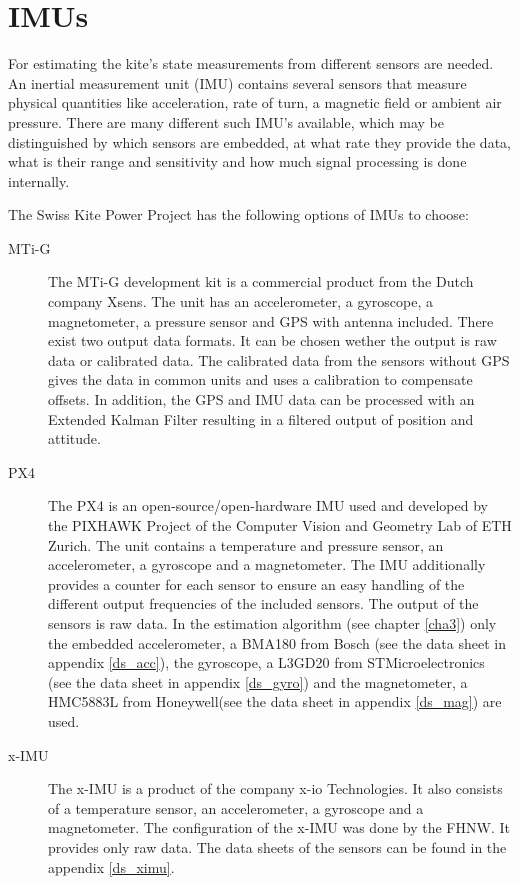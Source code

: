 \chapter{IMUs}\label{cha2}

For estimating the kite's state measurements from different sensors are needed. An inertial measurement unit (IMU) contains several sensors that measure physical quantities like acceleration, rate of turn, a magnetic field or ambient air pressure. There are many different such IMU's available, which may be distinguished by which sensors are embedded, at what rate they provide the data, what is their range and sensitivity and how much signal processing is done internally.

The Swiss Kite Power Project has the following options of IMUs to choose:

\begin{description}
\item[MTi-G]
The MTi-G development kit is a commercial product from the Dutch company Xsens. The unit has an accelerometer, a gyroscope, a magnetometer, a pressure sensor and GPS with antenna included. There exist two output data formats. It can be chosen wether the output is raw data or calibrated data. The calibrated data from the sensors without GPS gives the data in common units and uses a calibration to compensate offsets. In addition, the GPS and IMU data can be processed with an Extended Kalman Filter resulting in a filtered output of position and attitude.

\item[PX4]
The PX4 is an open-source/open-hardware IMU used and developed by the PIXHAWK Project of the Computer Vision and Geometry Lab of ETH Zurich. The unit contains a temperature and pressure sensor, an accelerometer, a gyroscope and a magnetometer. The IMU additionally provides a counter for each sensor to ensure an easy handling of the different output frequencies of the included sensors. The output of the sensors is raw data. In the estimation algorithm (see chapter \ref{cha3}) only the embedded accelerometer, a BMA180 from Bosch (see the data sheet in appendix \ref{ds_acc}), the gyroscope, a L3GD20 from STMicroelectronics (see the data sheet in appendix \ref {ds_gyro}) and the magnetometer, a HMC5883L from Honeywell(see the data sheet in appendix \ref{ds_mag}) are used.

\item[x-IMU]
The x-IMU is a product of the company x-io Technologies. It also consists of a temperature sensor, an accelerometer, a gyroscope and a magnetometer. The configuration of the x-IMU was done by the FHNW. It provides only raw data. The data sheets of the sensors can be found in the appendix \ref{ds_ximu}.
\end{description}


